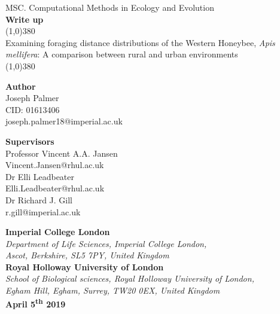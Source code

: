 \documentclass[11pt,usenames,dvipsnames]{article}
\begin{document}
\begin{titlepage}
\begin{center}
	\large{MSC. Computational Methods in Ecology and Evolution }\\
	\textbf{ Write up}\\[0cm]
	\huge{\line(1,0){380}\\
		Examining foraging distance distributions of the Western Honeybee, \textit{Apis mellifera}: A comparison between rural and urban environments\\
	\line(1,0){380}}\\[2cm]
\end{center}


\begin{minipage}[t]{0.5\textwidth}
\begin{flushleft}
	\Large{\textbf{Author}}\\
	\large{ Joseph Palmer\\
		CID: 01613406}\\
	joseph.palmer18@imperial.ac.uk\\[1cm]	
\end{flushleft}
\end{minipage}
\begin{minipage}[t]{0.5\textwidth}
\begin{flushright}
	\Large{\textbf{Supervisors}}\\
	\large{ Professor Vincent A.A. Jansen}\\
	Vincent.Jansen@rhul.ac.uk\\
	\large{Dr Elli Leadbeater}\\
	Elli.Leadbeater@rhul.ac.uk\\
	\large{Dr Richard J. Gill}\\
	r.gill@imperial.ac.uk
\end{flushright}
\end{minipage}

\vspace{1cm}
\begin{center}
	\large{\textbf{Imperial College London }}\\[0.2cm]
	\large{\textit{Department of Life Sciences, Imperial College London,}\\
		\textit{Ascot, Berkshire, SL5 7PY, United Kingdom}}\\[1cm]
	
	\large{\textbf{Royal Holloway University of London }}\\[0.2cm]
	\large{\textit{School of Biological sciences, Royal Holloway University of London,\\
			Egham Hill, Egham, Surrey, TW20 0EX, United Kingdom}}\\[1cm]
	\textbf{April 5\textsuperscript{th} 2019}
\end{center}

\end{titlepage}
\newpage
\tableofcontents
\newpage
\end{document}
